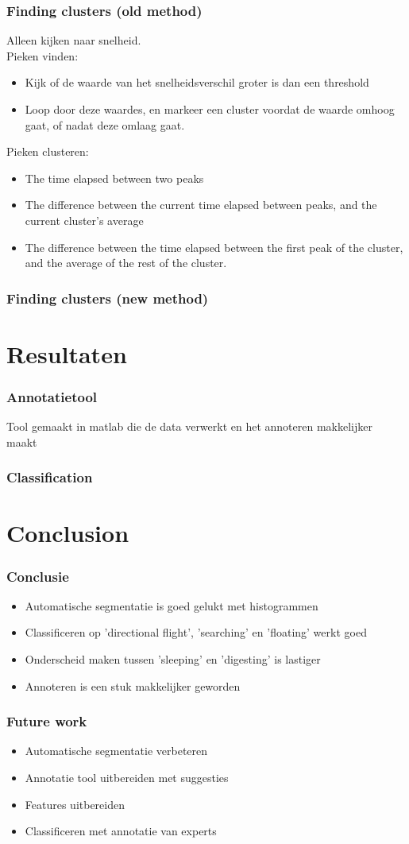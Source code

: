 \documentclass{beamer}
\newcommand{\slide}[2]
{
\begin{frame}
\frametitle{#1} 

#2

\end{frame}
}
\begin{document}
\slide{Finding clusters (old method)}
{
     Alleen kijken naar snelheid.\\
     Pieken vinden:
 \begin{itemize}
    \item Kijk of de waarde van het snelheidsverschil groter is dan een
    threshold
    \item Loop door deze waardes, en markeer een cluster voordat de waarde omhoog
    gaat, of nadat deze omlaag gaat.
 \end{itemize}
    Pieken clusteren:
    \begin{itemize}
 \item The time elapsed between two peaks
 \item The difference between the current time elapsed between peaks, and the
 current cluster's average
 \item The difference between the time elapsed between the first peak of the
 cluster, and the average of the rest of the cluster.
 \end{itemize}

}


\slide{Finding clusters (new method)}
{
    
}



\section{Resultaten}
\slide{Annotatietool}
{
	Tool gemaakt in matlab die de data verwerkt en het annoteren makkelijker maakt
}

\slide{Classification}
{
	
}

\section{Conclusion}

\slide{Conclusie}
{
\begin{itemize}
	\item Automatische segmentatie is goed gelukt met histogrammen
	\item Classificeren op 'directional flight', 'searching' en 'floating' werkt goed
	\item Onderscheid maken tussen 'sleeping' en 'digesting' is lastiger
	\item Annoteren is een stuk makkelijker geworden
\end{itemize} 
}

\slide{Future work}
{
\begin{itemize}
	\item Automatische segmentatie verbeteren
	\item Annotatie tool uitbereiden met suggesties
	\item Features uitbereiden
	\item Classificeren met annotatie van experts
\end{itemize} 
}
\end{document}
